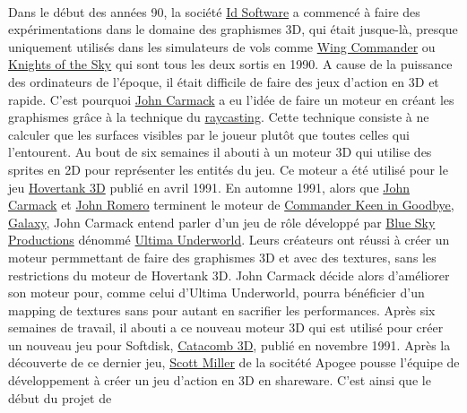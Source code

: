 \documentclass[12pt]{report}
\begin{document}
\paragraph{}
Dans le début des années 90, la société \href{https://fr.wikipedia.org/wiki/Id_Software}{Id Software} a commencé à faire
des expérimentations dans le domaine des graphismes 3D, qui était jusque-là, presque uniquement utilisés dans les simulateurs de vols
comme \href{https://fr.wikipedia.org/wiki/Wing_Commander_(jeu_vid%C3%A9o)}{Wing Commander} ou \href{https://en.wikipedia.org/wiki/Knights_of_the_Sky}{Knights of the Sky}
qui sont tous les deux sortis en 1990. A cause de la puissance des ordinateurs de l'époque, il était difficile de faire des jeux
d'action en 3D et rapide. C'est pourquoi \href{https://fr.wikipedia.org/wiki/John_Carmack}{John Carmack} a eu l'idée de faire un moteur
en créant les graphismes grâce à la technique du \href{https://fr.wikipedia.org/wiki/Raycasting}{raycasting}. Cette technique consiste
à ne calculer que les surfaces visibles par le joueur plutôt que toutes celles qui l'entourent. Au bout de six semaines il abouti 
à un moteur 3D qui utilise des sprites en 2D pour représenter les entités du jeu. Ce moteur a été utilisé pour le jeu 
\href{https://fr.wikipedia.org/wiki/Hovertank_3D}{Hovertank 3D} publié en avril 1991.
En automne 1991, alors que \href{https://fr.wikipedia.org/wiki/John_Carmack}{John Carmack} et \href{https://fr.wikipedia.org/wiki/John_Romero}{John Romero}
terminent le moteur de \href{https://en.wikipedia.org/wiki/Commander_Keen_in_Goodbye,_Galaxy}{Commander Keen in Goodbye, Galaxy}, 
John Carmack entend parler d'un jeu de rôle développé par \href{https://fr.wikipedia.org/wiki/Looking_Glass_Studios}{Blue Sky Productions}
dénommé \href{https://fr.wikipedia.org/wiki/Ultima_Underworld}{Ultima Underworld}. Leurs créateurs ont réussi à créer un moteur 
permmettant de faire des graphismes 3D et avec des textures, sans les restrictions du moteur de Hovertank 3D.
John Carmack décide alors d'améliorer son moteur pour, comme celui d'Ultima Underworld, pourra bénéficier
d'un mapping de textures sans pour autant en sacrifier les performances.
Après six semaines de travail, il abouti a ce nouveau moteur 3D qui est utilisé pour créer
un nouveau jeu pour Softdisk, \href{https://fr.wikipedia.org/wiki/Catacomb_3D}{Catacomb 3D}, publié en novembre 1991.
Après la découverte de ce dernier jeu, \href{https://fr.wikipedia.org/wiki/Scott_Miller_(programmeur)}{Scott Miller} de la socitété
Apogee pousse l'équipe de développement à créer un jeu d'action en 3D en shareware. C'est ainsi que le début du projet de
\end{document}
